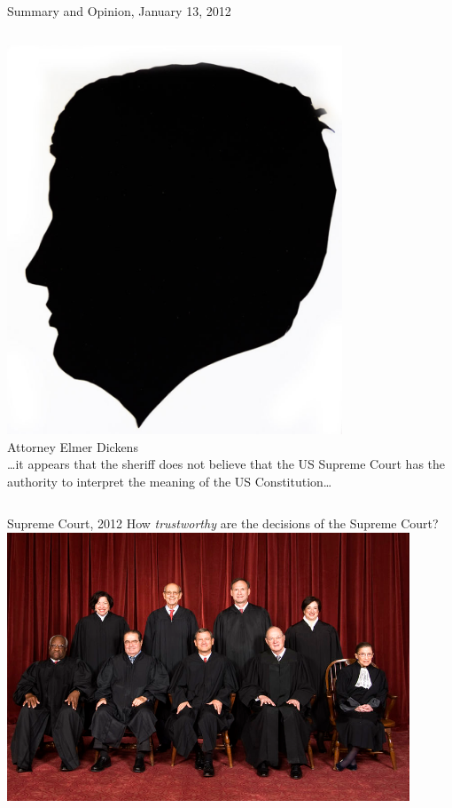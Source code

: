 \documentclass{beamer}
\begin{document}
\begin{frame}{Summary and Opinion, January 13, 2012}
    \begin{columns}[onlytextwidth]
            \centering
            \includegraphics[width=0.75\textwidth]{img/elmer-dickens.png}
            \\ Attorney Elmer Dickens \\
\ldots it appears that the sheriff  does not believe that the US Supreme Court has the authority to interpret the meaning of the US Constitution\ldots
    \end{columns}
\end{frame}

\begin{frame}{Supreme Court, 2012}
    \centering
    {\LARGE How \emph{trustworthy} are the decisions of the Supreme Court? } \\
    \includegraphics[width=0.9\textwidth]{img/supreme.png} \\
\end{frame}
\end{document}
